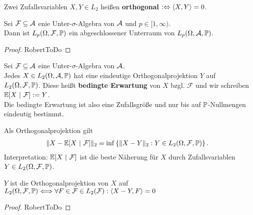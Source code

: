 \begin{bemerkung}
Zwei Zufallsvariablen $X,Y\in L_2$ heißen \textbf{orthogonal} $:\gdw\langle X,Y\rangle=0$.
\end{bemerkung}

\begin{proposition}
Sei $\mathcal{F}\subseteq\A$ enie Unter-$\sigma$-Algebra von $\A$ und $p\in[1,\infty)$.\\
Dann ist $L_p(\Omega,\mathcal{F},\P)$ ein abgeschlossener Unterraum von $L_p(\Omega,\A,\P)$.

\end{proposition}

\begin{proof}
RobertToDo
\end{proof}

\begin{defi}\enter
Sei $\mathcal{F}\subseteq\A$ eine Unter-$\sigma$-Algebra von $\A$.\\
Jedes $X\in L_2(\Omega,\mathcal{A},\P)$ hat eine eindeutige Orthogonalprojektion $Y$ auf $L_2(\Omega,\mathcal{F},\P)$. Diese heißt \textbf{bedingte Erwartung} von $X$ bzgl. $\mathcal{F}$ und wir schreiben $\E[X~|~\mathcal{F}]:=Y$.\\
Die bedingte Erwartung ist also eine Zufallsgröße und nur bis auf $\P$-Nullmengen eindeutig bestimmt.
\end{defi}

\begin{bemerkung}
Als Orthogonalprojektion gilt
\begin{align*}
\Vert X-\E[X~|~\mathcal{F}]\Vert_2=\inf\left\lbrace\Vert X-Y\Vert_2:Y\in L_2(\Omega,\mathcal{F},\P)\right\rbrace.
\end{align*}
Interpretation: $\E[X~|~\mathcal{F}]$ ist die beste Näherung für $X$ durch Zufallsvariablen $Y\in L_2(\Omega,\mathcal{F},\P)$.
\end{bemerkung}

\begin{proposition}
$Y$ ist die Orthogonalprojektion von $X$ auf $L_2(\Omega,\mathcal{F},\P)\\\Longleftrightarrow\forall F\in\mathcal{F}\in L_2(\mathcal{F}):\langle X-Y,F\rangle=0$
\end{proposition}
\begin{proof}
RobertToDo
\end{proof}

